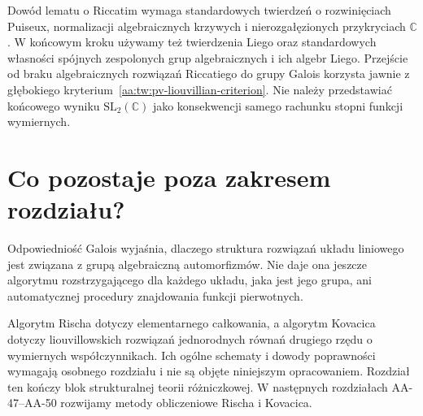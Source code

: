 \begin{uwaga}
\label{aa:uw:pv-airy-deep-inputs}
Dowód lematu o Riccatim
wymaga standardowych twierdzeń o rozwinięciach Puiseux,
normalizacji algebraicznych krzywych i nierozgałęzionych
przykryciach $\mathbb C$. W końcowym kroku używamy też
twierdzenia Liego oraz standardowych własności spójnych
zespolonych grup algebraicznych i ich algebr Liego. Przejście od
braku algebraicznych rozwiązań
Riccatiego do grupy Galois
korzysta jawnie z głębokiego
kryterium~\ref{aa:tw:pv-liouvillian-criterion}.
Nie należy przedstawiać
końcowego wyniku
$\mathrm{SL}_2(\mathbb C)$
jako konsekwencji samego
rachunku stopni funkcji
wymiernych.
\end{uwaga}

\section{Co pozostaje poza zakresem rozdziału?}

Odpowiedniość Galois wyjaśnia,
dlaczego struktura rozwiązań
układu liniowego jest związana
z grupą algebraiczną automorfizmów.
Nie daje ona jeszcze
algorytmu rozstrzygającego
dla każdego układu,
jaka jest jego grupa,
ani automatycznej procedury
znajdowania funkcji pierwotnych.

Algorytm Rischa dotyczy
elementarnego całkowania,
a algorytm Kovacica dotyczy
liouvillowskich rozwiązań
jednorodnych równań
drugiego rzędu o wymiernych
współczynnikach. Ich ogólne
schematy i dowody poprawności
wymagają osobnego rozdziału
i nie są objęte niniejszym
opracowaniem. Rozdział ten kończy blok strukturalnej teorii różniczkowej.
W następnych rozdziałach AA-47--AA-50 rozwijamy metody
obliczeniowe Rischa i Kovacica.
